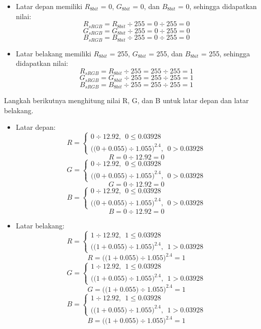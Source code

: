 \begin{itemize}
	\item Latar depan memiliki $R_{8bit}$ = 0, $G_{8bit}$ = 0, dan $B_{8bit}$ = 0, sehingga didapatkan nilai: 
			\[
				R_{sRGB} = R_{8bit}\div 255 = 0\div 255 = 0
			\]
			\[
				G_{sRGB} = G_{8bit}\div 255 = 0\div 255 = 0
			\]
			\[
				B_{sRGB} = B_{8bit}\div 255 = 0\div 255 = 0
			\]
	\item Latar belakang memiliki $R_{8bit}$ = 255, $G_{8bit}$ = 255, dan $B_{8bit}$ = 255, sehingga didapatkan nilai:
			\[
				R_{sRGB} = R_{8bit}\div 255 = 255\div 255 = 1
			\]
			\[
				G_{sRGB} = G_{8bit}\div 255 = 255\div 255 = 1
			\]
			\[
				B_{sRGB} = B_{8bit}\div 255 = 255\div 255 = 1
			\]
\end{itemize}

Langkah berikutnya menghitung nilai R, G, dan B untuk latar depan dan latar belakang.

\begin{itemize}
	\item Latar depan:
			\[
				R=\left\{
				\begin{array}{rr}
				0\div 12.92,\ \ 0\le 0.03928 \\ 
				{{((0}+0.055)\div 1.055)}^{2.4},\ \ 0>0.03928
				\end{array}
				\right.
			\]
			\[
				R=0\div 12.92 = 0
			\]
			\[
				G=\left\{
				\begin{array}{rr}
				0\div 12.92,\ \ 0\le 0.03928 \\ 
				{{((0}+0.055)\div 1.055)}^{2.4},\ \ 0>0.03928
				\end{array}
				\right.
			\]
			\[
				G=0\div 12.92 = 0
			\]
			\[
				B=\left\{
				\begin{array}{rr}
				0\div 12.92,\ \ 0\le 0.03928 \\ 
				{{((0}+0.055)\div 1.055)}^{2.4},\ \ 0>0.03928
				\end{array}
				\right.
			\]
			\[
				B=0\div 12.92 = 0
			\]
	\item Latar belakang:
			\[
				R=\left\{
				\begin{array}{rr}
				1\div 12.92,\ \ 1\le 0.03928 \\ 
				{{((1}+0.055)\div 1.055)}^{2.4},\ \ 1>0.03928
				\end{array}
				\right.
			\]
			\[
				R={{((1}+0.055)\div 1.055)}^{2.4} = 1
			\]
			\[
				G=\left\{
				\begin{array}{rr}
				1\div 12.92,\ \ 1\le 0.03928 \\ 
				{{((1}+0.055)\div 1.055)}^{2.4},\ \ 1>0.03928
				\end{array}
				\right.
			\]
			\[
				G={{((1}+0.055)\div 1.055)}^{2.4} = 1
			\]
			\[
				B=\left\{
				\begin{array}{rr}
				1\div 12.92,\ \ 1\le 0.03928 \\ 
				{{((1}+0.055)\div 1.055)}^{2.4},\ \ 1>0.03928
				\end{array}
				\right.
			\]
			\[
				B={{((1}+0.055)\div 1.055)}^{2.4} = 1
			\]
\end{itemize}


